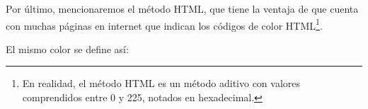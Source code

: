 Por último, mencionaremos el método HTML, que tiene la ventaja de que cuenta con muchas páginas en internet que indican los códigos de color HTML\footnote{En realidad, el método HTML es un método aditivo con valores comprendidos entre 0 y 225, notados en hexadecimal.}.

El mismo color se define así:

\begin{latexcode}
\end{latexcode}




